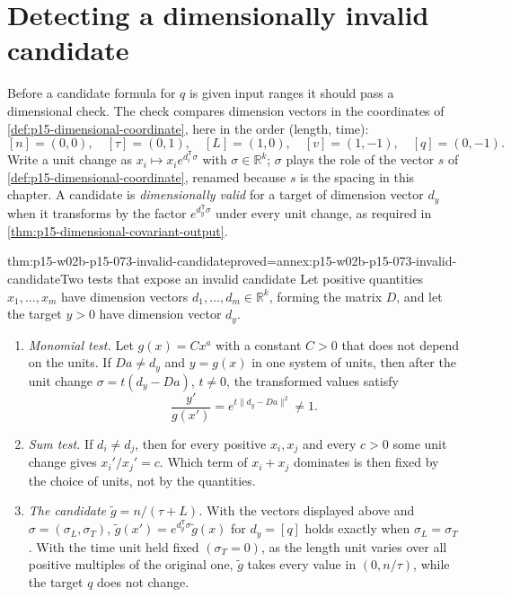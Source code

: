 \section{Detecting a dimensionally invalid candidate}
\label{sec:p15-w02b-p15-073-invalid}

Before a candidate formula for \(q\) is given input ranges it should pass a
dimensional check. The check compares dimension vectors in the coordinates
of \cref{def:p15-dimensional-coordinate}, here in the order (length, time):
\[
 [n]=(0,0),\quad [\tau]=(0,1),\quad [L]=(1,0),\quad
 [v]=(1,-1),\quad [q]=(0,-1).
\]
Write a unit change as \(x_i\mapsto x_i e^{d_i^{\mathsf T}\sigma}\) with
\(\sigma\in\mathbb R^k\); \(\sigma\) plays the role of the vector \(s\) of
\cref{def:p15-dimensional-coordinate}, renamed because \(s\) is the spacing
in this chapter. A candidate is \emph{dimensionally valid} for a target of
dimension vector \(d_y\) when it transforms by the factor
\(e^{d_y^{\mathsf T}\sigma}\) under every unit change, as required in
\cref{thm:p15-dimensional-covariant-output}.

\begin{hblemma}{thm:p15-w02b-p15-073-invalid-candidate}{proved=annex:p15-w02b-p15-073-invalid-candidate}{Two tests that expose an invalid candidate}
Let positive quantities \(x_1,\ldots,x_m\) have dimension vectors
\(d_1,\ldots,d_m\in\mathbb R^k\), forming the matrix \(D\), and let the
target \(y>0\) have dimension vector \(d_y\).
\begin{enumerate}
\item \emph{Monomial test.} Let \(g(x)=Cx^a\) with a constant \(C>0\) that
does not depend on the units. If \(Da\neq d_y\) and \(y=g(x)\) in one system
of units, then after the unit change \(\sigma=t(d_y-Da)\), \(t\neq0\), the
transformed values satisfy
\[
 \frac{y'}{g(x')}=e^{t\lVert d_y-Da\rVert^2}\neq1 .
\]
\item \emph{Sum test.} If \(d_i\neq d_j\), then for every positive
\(x_i,x_j\) and every \(c>0\) some unit change gives
\(x_i'/x_j'=c\). Which term of \(x_i+x_j\) dominates is then fixed by the
choice of units, not by the quantities.
\item \emph{The candidate \(\tilde g=n/(\tau+L)\).} With the vectors
displayed above and \(\sigma=(\sigma_L,\sigma_T)\),
\(\tilde g(x')=e^{d_y^{\mathsf T}\sigma}\tilde g(x)\) for \(d_y=[q]\) holds
exactly when \(\sigma_L=\sigma_T\). With the time unit held fixed
\((\sigma_T=0)\), as the length unit varies over all positive multiples of
the original one, \(\tilde g\) takes every value in \((0,n/\tau)\), while
the target \(q\) does not change.
\end{enumerate}
\end{hblemma}

